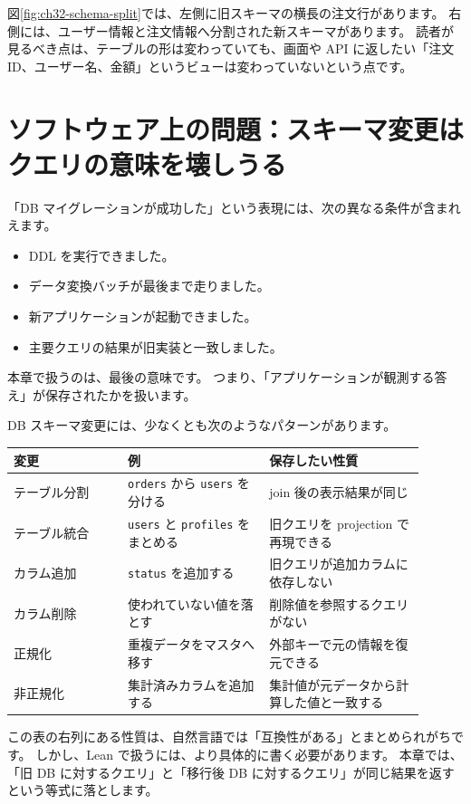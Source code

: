 
図\ref{fig:ch32-schema-split}では、左側に旧スキーマの横長の注文行があります。
右側には、ユーザー情報と注文情報へ分割された新スキーマがあります。
読者が見るべき点は、テーブルの形は変わっていても、画面や API に返したい「注文 ID、ユーザー名、金額」というビューは変わっていないという点です。

\section{ソフトウェア上の問題：スキーマ変更はクエリの意味を壊しうる}

「DB マイグレーションが成功した」という表現には、次の異なる条件が含まれえます。
\begin{itemize}
\item DDL を実行できました。
\item データ変換バッチが最後まで走りました。
\item 新アプリケーションが起動できました。
\item 主要クエリの結果が旧実装と一致しました。
\end{itemize}
本章で扱うのは、最後の意味です。
つまり、「アプリケーションが観測する答え」が保存されたかを扱います。

DB スキーマ変更には、少なくとも次のようなパターンがあります。

\begin{longtable}{p{0.25\linewidth}p{0.31\linewidth}p{0.34\linewidth}}
\toprule
変更 & 例 & 保存したい性質 \\
\midrule
テーブル分割 & \texttt{orders} から \texttt{users} を分ける & join 後の表示結果が同じ \\
テーブル統合 & \texttt{users} と \texttt{profiles} をまとめる & 旧クエリを projection で再現できる \\
カラム追加 & \texttt{status} を追加する & 旧クエリが追加カラムに依存しない \\
カラム削除 & 使われていない値を落とす & 削除値を参照するクエリがない \\
正規化 & 重複データをマスタへ移す & 外部キーで元の情報を復元できる \\
非正規化 & 集計済みカラムを追加する & 集計値が元データから計算した値と一致する \\
\bottomrule
\end{longtable}

この表の右列にある性質は、自然言語では「互換性がある」とまとめられがちです。
しかし、Lean で扱うには、より具体的に書く必要があります。
本章では、「旧 DB に対するクエリ」と「移行後 DB に対するクエリ」が同じ結果を返すという等式に落とします。

